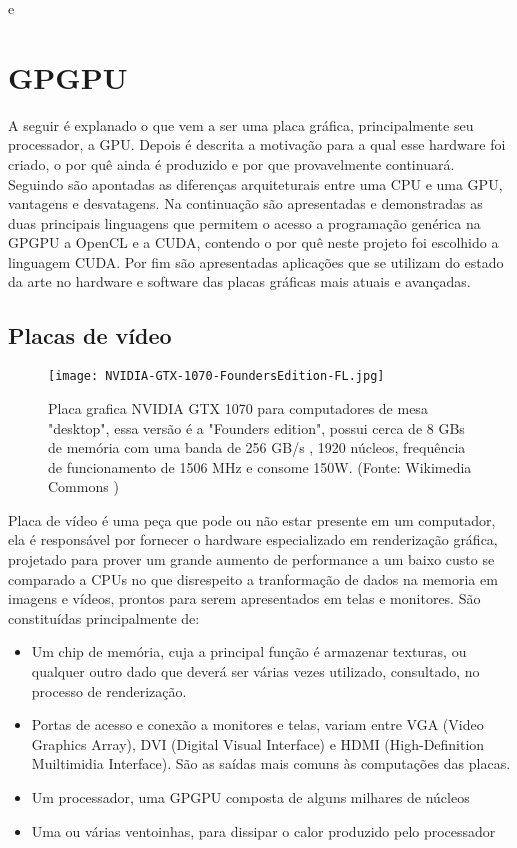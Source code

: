 e\chapter{GPGPU}
\label{cap:gpgpu}

A seguir é explanado o que vem a ser uma placa gráfica, principalmente seu processador, a GPU. Depois é descrita a motivação para a qual esse hardware foi criado, o por quê ainda é produzido e por que provavelmente continuará. Seguindo são apontadas as diferenças arquiteturais entre uma CPU e uma GPU, vantagens e desvatagens. Na continuação são apresentadas e demonstradas as duas principais linguagens que permitem o acesso a programação genérica na GPGPU a OpenCL e a CUDA, contendo o por quê neste projeto foi escolhido a linguagem CUDA. Por fim são apresentadas aplicações que se utilizam do estado da arte no hardware e software das placas gráficas mais atuais e avançadas.

\section{Placas de vídeo}
\label{sec:video_boards}
  \begin{figure}[!h]
    \centering
    \texttt{[image: NVIDIA-GTX-1070-FoundersEdition-FL.jpg]}
    \caption{Placa grafica NVIDIA GTX 1070 para computadores de mesa "desktop", essa versão é a "Founders edition", possui cerca de 8 GBs de memória com uma banda de 256 GB/s , 1920 núcleos, frequência de funcionamento de 1506 MHz e consome 150W. (Fonte: Wikimedia Commons \protect\footnotemark)}
    \label{fig:gtx1070}
  \end{figure}


  Placa de vídeo é uma peça que pode ou não estar presente em um computador, ela é responsável por fornecer o hardware especializado em renderização gráfica, projetado para prover um grande aumento de performance a um baixo custo se comparado a CPUs no que disrespeito a tranformação de dados na memoria em imagens e vídeos, prontos para serem apresentados em telas e monitores. São constituídas principalmente de:
  \begin{itemize}
    \item Um chip de memória, cuja a principal função é armazenar texturas, ou qualquer outro dado que deverá ser várias vezes utilizado, consultado, no processo de renderização.
    \item Portas de acesso e conexão a monitores e telas, variam entre VGA (Video Graphics Array), DVI (Digital Visual Interface) e HDMI (High-Definition Muiltimidia Interface). São as saídas mais comuns às computações das placas.
    \item Um processador, uma GPGPU composta de alguns milhares de núcleos
    \item Uma ou várias ventoinhas, para dissipar o calor produzido pelo processador
  \end{itemize}

